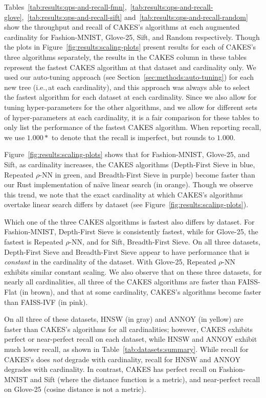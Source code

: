 Tables~\ref{tab:results:qps-and-recall-fmn},~\ref{tab:results:qps-and-recall-glove},~\ref{tab:results:qps-and-recall-sift} and~\ref{tab:results:qps-and-recall-random} show the throughput and recall of CAKES's algorithms at each augmented cardinality for Fashion-MNIST, Glove-25, Sift, and Random respectively.
Though the plots in Figure~\ref{fig:results:scaling-plots} present results for each of CAKES's three algorithms separately, the results in the CAKES column in these tables represent the fastest CAKES algorithm at that dataset and cardinality only.
We used our auto-tuning approach (see Section~\ref{sec:methods:auto-tuning}) for each new tree (i.e.,\,at each cardinality), and this approach was always able to select the fastest algorithm for each dataset at each cardinality.
Since we also allow for tuning hyper-parameters for the other algorithms, and we allow for different sets of hyper-parameters at each cardinality, it is a fair comparison for these tables to only list the performance of the fastest CAKES algorithm.
When reporting recall, we use $1.000*$ to denote that the recall is imperfect, but rounds to $1.000$.

Figure~\ref{fig:results:scaling-plots} shows that for Fashion-MNIST, Glove-25, and Sift, as cardinality increases, the CAKES algorithms (Depth-First Sieve in blue, Repeated $\rho$-NN in green, and Breadth-First Sieve in purple) become faster than our Rust implementation of na\"{i}ve linear search (in orange).
Though we observe this trend, we note that the exact cardinality at which CAKES's algorithms overtake linear search differs by dataset (see Figure~\ref{fig:results:scaling-plots}).

Which one of the three CAKES algorithms is fastest also differs by dataset.
For Fashion-MNIST, Depth-First Sieve is consistently fastest, while for Glove-25, the fastest is Repeated $\rho$-NN, and for Sift, Breadth-First Sieve.
On all three datasets, Depth-First Sieve and Breadth-First Sieve appear to have performance that is \textit{constant} in the cardinality of the dataset.
With Glove-25, Repeated $\rho$-NN exhibits similar constant scaling.
We also observe that on these three datasets, for nearly all cardinalities, all three of the CAKES algorithms are faster than FAISS-Flat (in brown), and that at some cardinality, CAKES's algorithms become faster than FAISS-IVF (in pink).

On all three of these datasets, HNSW (in gray) and ANNOY (in yellow) are faster than CAKES's algorithms for all cardinalities; however, CAKES exhibits perfect or near-perfect recall on each dataset, while HNSW and ANNOY exhibit much lower recall, as shown in Table~\ref{tab:datasets:summary}.
While recall for CAKES's does \emph{not} degrade with cardinality, recall for HNSW and ANNOY degrades with cardinality.
In contrast, CAKES has perfect recall on Fashion-MNIST and Sift (where the distance function is a metric), and near-perfect recall on Glove-25 (cosine distance is not a metric).


